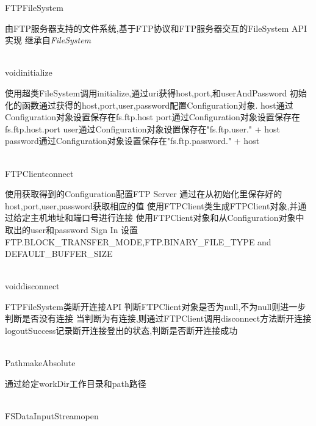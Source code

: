 \begin{XeClass}{FTPFileSystem}
   
 由FTP服务器支持的文件系统,基于FTP协议和FTP服务器交互的FileSystem API实现
 继承自\emph{FileSystem}

  \begin{XeMethod}{\XePublic\\ }{void}{initialize}
       
 使用超类FileSystem调用initialize,通过uri获得host,port,和userAndPassword
 初始化的函数通过获得的host,port,user,password配置Configuration对象.
 host通过Configuration对象设置保存在fs.ftp.host
 port通过Configuration对象设置保存在fs.ftp.host.port
 user通过Configuration对象设置保存在"fs.ftp.user." + host
 password通过Configuration对象设置保存在"fs.ftp.password." + host

  \end{XeMethod}

  \begin{XeMethod}{\XePrivate\\ }{FTPClient}{connect}
       
 使用获取得到的Configuration配置FTP Server
 通过在从初始化里保存好的host,port,user,password获取相应的值
 使用FTPClient类生成FTPClient对象,并通过给定主机地址和端口号进行连接
 使用FTPClient对象和从Configuration对象中取出的user和password Sign In
 设置FTP.BLOCK{\_}TRANSFER{\_}MODE,FTP.BINARY{\_}FILE{\_}TYPE and DEFAULT{\_}BUFFER{\_}SIZE

  \end{XeMethod}

  \begin{XeMethod}{\XePrivate\\ }{void}{disconnect}
       
 FTPFileSystem类断开连接API
 判断FTPClient对象是否为null,不为null则进一步判断是否没有连接
 当判断为有连接,则通过FTPClient调用disconnect方法断开连接
 logoutSuccess记录断开连接登出的状态,判断是否断开连接成功

  \end{XeMethod}

  \begin{XeMethod}{\XePrivate\\ }{Path}{makeAbsolute}
       
 通过给定workDir工作目录和path路径

  \end{XeMethod}

  \begin{XeMethod}{\XePublic\\ }{FSDataInputStream}{open}
       

\end{XeMethod}
\end{XeClass}
